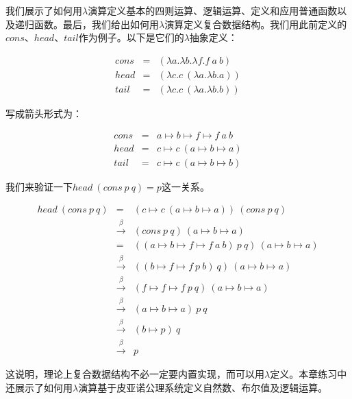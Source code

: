 \documentclass{article}
\begin{document}
我们展示了如何用$\lambda$演算定义基本的四则运算、逻辑运算、定义和应用普通函数以及递归函数。最后，我们给出如何用$\lambda$演算定义复合数据结构。我们用此前定义的$cons$、$head$、$tail$作为例子。以下是它们的$\lambda$抽象定义：

\[
\begin{array}{rcl}
cons & = & (\lambda a . \lambda b . \lambda f . f\ a\ b) \\
head & = & (\lambda c . c\ (\lambda a . \lambda b . a)) \\
tail & = & (\lambda c . c\ (\lambda a . \lambda b . b))
\end{array}
\]

写成箭头形式为：

\[
\begin{array}{rcl}
cons & = & a \mapsto b \mapsto f \mapsto f\ a\ b \\
head & = & c \mapsto c\ (a \mapsto b \mapsto a) \\
tail & = & c \mapsto c\ (a \mapsto b \mapsto b)
\end{array}
\]

我们来验证一下$head\ (cons\ p\ q) = p$这一关系。

\[
\begin{array}{rcl}
head\ (cons\ p\ q) & = & (c \mapsto c\ (a \mapsto b \mapsto a))\ (cons\ p\ q) \\
                   & \xrightarrow{\beta} & (cons\ p\ q)\ (a \mapsto b \mapsto a) \\
                   & = & ((a \mapsto b \mapsto f \mapsto f\ a\ b)\ p\ q)\ (a \mapsto b \mapsto a) \\
                   & \xrightarrow{\beta} & ((b \mapsto f \mapsto f\ p\ b)\ q)\ (a \mapsto b \mapsto a) \\
                   & \xrightarrow{\beta} & (f \mapsto f \mapsto f\ p\ q)\ (a \mapsto b \mapsto a) \\
                   & \xrightarrow{\beta} & (a \mapsto b \mapsto a)\ p\ q \\
                   & \xrightarrow{\beta} & (b \mapsto p)\ q \\
                   & \xrightarrow{\beta} & p
\end{array}
\]

这说明，理论上复合数据结构不必一定要内置实现，而可以用$\lambda$定义。本章练习中还展示了如何用$\lambda$演算基于皮亚诺公理系统定义自然数、布尔值及逻辑运算。
\end{document}
